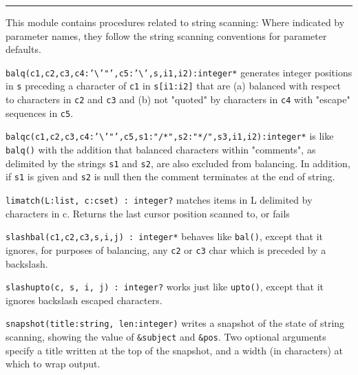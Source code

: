 \vspace{0.25cm}\hrule{}

This module contains procedures related to string
scanning: Where indicated by parameter names, they follow the string
scanning conventions for parameter defaults.

\texttt{balq(c1,c2,c3,c4:'{\textbackslash}'"',c5:'{\textbackslash}',s,i1,i2):integer*}
generates integer positions in \texttt{s} preceding a character of
\texttt{c1} in \texttt{s[i1:i2]} that are (a) balanced with respect to
characters in \texttt{c2} and \texttt{c3} and (b) not
"quoted" by characters in \texttt{c4} with
"escape" sequences in
\texttt{c5}.

\texttt{balqc(c1,c2,c3,c4:'{\textbackslash}'"',c5,s1:"/*",s2:"*/",s3,i1,i2):integer*}
is like \texttt{balq()} with the addition that balanced characters
within "comments", as delimited by the
strings \texttt{s1} and \texttt{s2}, are also excluded from balancing.
In addition, if \texttt{s1} is given and \texttt{s2} is null then the
comment terminates at the end of string.

\texttt{limatch(L:list, c:cset) : integer?} matches items in L delimited
by characters in c. Returns the last cursor position scanned to, or
fails 

\texttt{slashbal(c1,c2,c3,s,i,j) : integer*} behaves like
\texttt{bal()}, except that it ignores, for purposes of balancing, any
\texttt{c2} or \texttt{c3} char which is preceded by a backslash.

\texttt{slashupto(c, s, i, j) : integer?} works just like
\texttt{upto()}, except that it ignores backslash escaped characters.

\texttt{snapshot(title:string, len:integer)} writes a snapshot of the
state of string scanning, showing the value of \texttt{\&subject} and
\texttt{\&pos}. Two optional arguments specify a title written at the
top of the snapshot, and a width (in characters) at which to wrap
output. %




